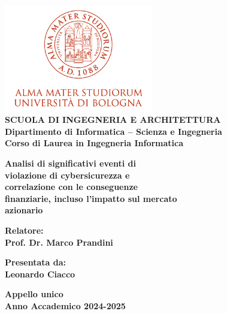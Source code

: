 \begin{titlepage}
\begin{center}
\includegraphics[width=2.56in]{figures/logo/logo_unibo.png}\\
\vspace{5mm}
{\small{\bf SCUOLA DI INGEGNERIA E ARCHITETTURA\\
\vspace{2mm}
Dipartimento di Informatica -- Scienza e Ingegneria\\
\vspace{2mm}
Corso di Laurea in Ingegneria Informatica }}
\end{center}
\vspace{1.2mm}
\begin{center}
{\LARGE{\bf Analisi di significativi eventi di\\
\vspace{3mm}
violazione di cybersicurezza e\\
\vspace{3mm}
correlazione con le conseguenze\\
\vspace{3mm}
finanziarie, incluso l'impatto sul mercato\\
\vspace{3mm}
azionario\\
\vspace{3mm}}}

\end{center}
\vspace{11.9mm}
\par
\noindent
\begin{minipage}[t]{0.47\textwidth}
{\normalsize{\bf Relatore:\\
Prof. Dr. Marco Prandini}}
\end{minipage}
\hfill
\begin{minipage}[t]{0.47\textwidth}\raggedleft
{\normalsize{\bf Presentata da:\\
Leonardo Ciacco}}
\end{minipage}
\vspace{15mm} %
\begin{center}
{\normalsize{\bf Appello unico\\%
Anno Accademico 2024-2025}}%
\end{center}
\end{titlepage}
